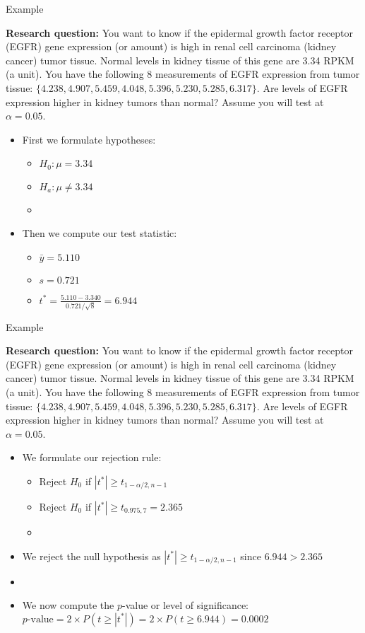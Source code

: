 \documentclass[xcolor=dvipsnames]{beamer}
\begin{document}
\begin{frame}{Example}

{\scriptsize  \textbf{Research question:} You want to know if the epidermal growth factor receptor (EGFR) gene expression (or amount) is high in renal cell carcinoma (kidney cancer) tumor tissue. Normal levels in kidney tissue of this gene are 3.34 RPKM (a unit). You have the following 8 measurements of EGFR expression from tumor tissue: $\{4.238, 4.907, 5.459, 4.048, 5.396, 5.230, 5.285, 6.317\}$. Are levels of EGFR expression higher in kidney tumors than normal? Assume you will test at $\alpha = 0.05$.}

	\begin{itemize}
		\item First we formulate hypotheses:
		\begin{itemize}
			\item $H_0: \mu = 3.34$
			\item $H_a: \mu \neq 3.34$
			\item[]
		\end{itemize}
	\item Then we compute our test statistic:
	\begin{itemize}
		\item $\bar{y} = 5.110$
		\item $s = 0.721$
		\item $t^* = \frac{5.110 - 3.340}{0.721 / \sqrt{8}} = 6.944$
	\end{itemize}
	\end{itemize}
\end{frame}

\begin{frame}{Example}

{\scriptsize  \textbf{Research question:} You want to know if the epidermal growth factor receptor (EGFR) gene expression (or amount) is high in renal cell carcinoma (kidney cancer) tumor tissue. Normal levels in kidney tissue of this gene are 3.34 RPKM (a unit). You have the following 8 measurements of EGFR expression from tumor tissue: $\{4.238, 4.907, 5.459, 4.048, 5.396, 5.230, 5.285, 6.317\}$. Are levels of EGFR expression higher in kidney tumors than normal? Assume you will test at $\alpha = 0.05$.}

\begin{itemize}
	\item We formulate our rejection rule: 
	\begin{itemize}
		\item Reject $H_0$ if $|t^*| \geq t_{1-\alpha / 2, n-1}$
		\item Reject $H_0$ if $|t^*| \geq t_{0.975, 7} = 2.365$
		\item[] 
	\end{itemize}
	\item We reject the null hypothesis as $|t^*| \geq t_{1-\alpha / 2, n-1}$ since $6.944 > 2.365$
	\item[]
	\item We now compute the $p$-value or level of significance: $p\text{-value}=2 \times P(t \geq |t^*|) = 2\times P(t \geq 6.944) = 0.0002$
\end{itemize}
\end{frame}
\end{document}
